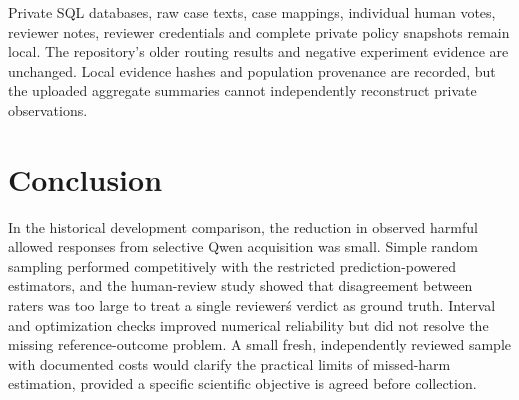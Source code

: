 \documentclass[11pt,a4paper]{article}
\begin{document}
Private SQL databases, raw case texts, case mappings, individual human votes, reviewer notes, reviewer credentials and complete private policy snapshots remain local. The repository's older routing results and negative experiment evidence are unchanged. Local evidence hashes and population provenance are recorded, but the uploaded aggregate summaries cannot independently reconstruct private observations.

\section{Conclusion}
In the historical development comparison, the reduction in observed harmful allowed responses from selective Qwen acquisition was small. Simple random sampling performed competitively with the restricted prediction-powered estimators, and the human-review study showed that disagreement between raters was too large to treat a single reviewer\'s verdict as ground truth. Interval and optimization checks improved numerical reliability but did not resolve the missing reference-outcome problem. A small fresh, independently reviewed sample with documented costs would clarify the practical limits of missed-harm estimation, provided a specific scientific objective is agreed before collection.
\end{document}
